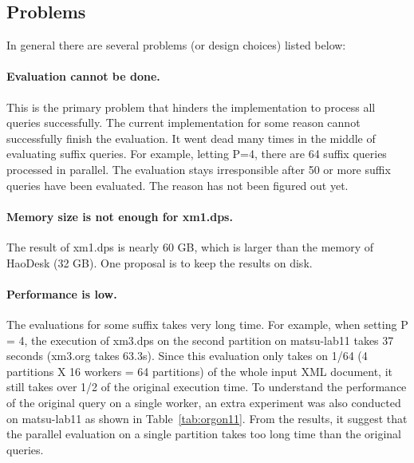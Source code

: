 


\subsection{Problems}
\label{sec:problems}
In general there are several problems (or design choices) listed below:

\paragraph{Evaluation cannot be done.}

This is the primary problem that hinders the implementation to process
all queries successfully.
The current implementation for some reason cannot successfully finish
the evaluation. It went dead many times in the middle of
evaluating suffix queries. For example, letting P=4, there are 64 suffix
queries processed in parallel. The evaluation stays irresponsible after
50 or more suffix queries have been evaluated. The reason has not been
figured out yet.

\paragraph{Memory size is not enough for xm1.dps.}
The result of xm1.dps is nearly 60 GB, which is larger than the memory
of HaoDesk (32 GB). One proposal is to keep the results on disk.


\paragraph{Performance is low.}

The evaluations for some suffix takes very long time.
For example, when setting P = 4, the execution of xm3.dps on the second partition
on matsu-lab11 takes 37 seconds (xm3.org takes 63.3s). Since this evaluation only 
takes on 1/64 (4 partitions X 16 workers = 64 partitions) of the whole 
input XML document, it still takes over 1/2 of the original execution time.
To understand the performance of the original query on a single worker, 
an extra  experiment was also conducted on matsu-lab11 as shown in Table~\ref{tab:orgon11}.
From the results, it suggest that the parallel evaluation on a single partition
takes too long time than the original queries. 

